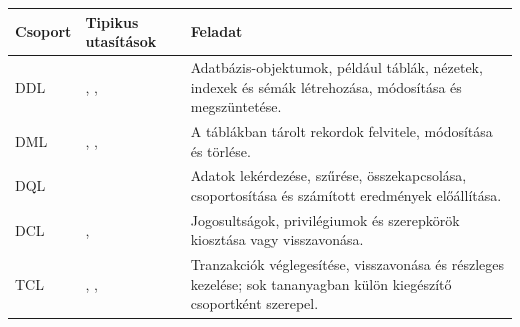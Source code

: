 \begin{tabularx}{\textwidth}{L{22mm}L{31mm}X}
\toprule
\textbf{Csoport} & \textbf{Tipikus utasítások} & \textbf{Feladat} \\
\midrule
DDL & , ,  & Adatbázis-objektumok, például táblák, nézetek, indexek és sémák létrehozása, módosítása és megszüntetése. \\
DML & , ,  & A táblákban tárolt rekordok felvitele, módosítása és törlése. \\
DQL &  & Adatok lekérdezése, szűrése, összekapcsolása, csoportosítása és számított eredmények előállítása. \\
DCL & ,  & Jogosultságok, privilégiumok és szerepkörök kiosztása vagy visszavonása. \\
TCL & , ,  & Tranzakciók véglegesítése, visszavonása és részleges kezelése; sok tananyagban külön kiegészítő csoportként szerepel. \\
\bottomrule
\end{tabularx}
